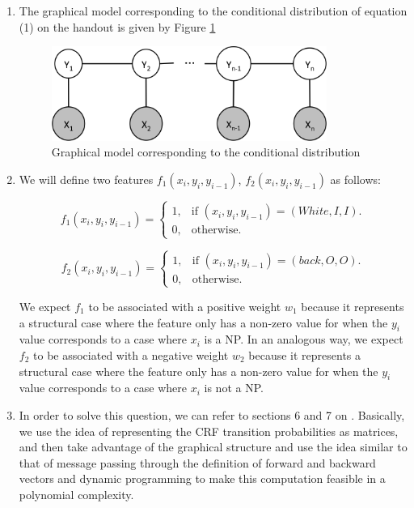 \documentclass{article}
\begin{document}
\begin{enumerate}

\item
The graphical model corresponding to the conditional distribution of equation (1) on the handout is given by Figure \ref{meanfieldmodel}\\

\begin{figure}[ht!]
\centering
\includegraphics[width=90mm]{3_1.png}
\caption{Graphical model corresponding to the conditional distribution}
\label{meanfieldmodel}
\end{figure}


\item
We will define two features $f_1(x_i,y_i,y_{i-1})$, $f_2(x_i,y_i,y_{i-1})$ as follows:

\begin{equation*}
f_1(x_i,y_i,y_{i-1})=\begin{cases}
    1, & \text{if $(x_i,y_i,y_{i-1})=(White, I, I)$}.\\
    0, & \text{otherwise}.
  \end{cases}
\end{equation*}

\begin{equation*}
f_2(x_i,y_i,y_{i-1})=\begin{cases}
    1, & \text{if $(x_i,y_i,y_{i-1})=(back, O, O)$}.\\
    0, & \text{otherwise}.
  \end{cases}
\end{equation*}

We expect $f_1$ to be associated with a positive weight $w_1$ because it represents a structural case where the feature only has a non-zero value for when the $y_i$ value corresponds to a case where $x_i$ is a NP.
In an analogous way, we expect $f_2$ to be associated with a negative weight $w_2$ because it represents a structural case where the feature only has a non-zero value for when the $y_i$ value corresponds to a case where $x_i$ is not a NP.

\item
In order to solve this question, we can refer to sections 6 and 7 on \cite{crf}. Basically, we use the idea of representing the CRF transition probabilities as matrices, and then take advantage of the graphical structure and use the idea similar to that of message passing through the definition of forward and backward vectors and dynamic programming to make this computation feasible in a polynomial complexity. 


\end{enumerate}
\end{document}
